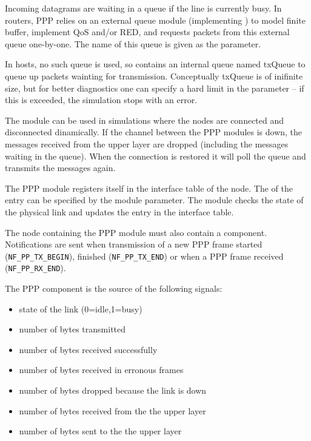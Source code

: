 Incoming datagrams are waiting in a queue if the line is currently busy.
In routers, PPP relies on an external queue module (implementing
) to model finite buffer, implement QoS and/or RED,
and requests packets from this external queue one-by-one. The name
of this queue is given as the  parameter.

In hosts, no such queue is used, so  contains an internal
queue named txQueue to queue up packets wainting for transmission.
Conceptually txQueue is of inifinite size, but for better diagnostics
one can specify a hard limit in the  parameter -- if
this is exceeded, the simulation stops with an error.

The module can be used in simulations where the nodes are connected and
disconnected dinamically. If the channel between the PPP modules is down,
the messages received from the upper layer are dropped (including the messages
waiting in the queue). When the connection is restored it will
poll the queue and transmits the messages again.

The PPP module registers itself in the interface table of the node.
The  of the entry can be specified by the
 module parameter. The module checks the state of the physical link
and updates the entry in the interface table.

The node containing the PPP module must also contain a
 component. Notifications are sent when
transmission of a new PPP frame started (\verb!NF_PP_TX_BEGIN!), finished
(\verb!NF_PP_TX_END!) or when a PPP frame received (\verb!NF_PP_RX_END!).

The PPP component is the source of the following signals:
\begin{itemize}
\item {} state of the link (0=idle,1=busy)
\item {} number of bytes transmitted
\item {} number of bytes received successfully
\item {} number of bytes received in erronous frames
\item {} number of bytes dropped because the link is down
\item {} number of bytes received from the the upper layer
\item {} number of bytes sent to the the upper layer
\end{itemize}

